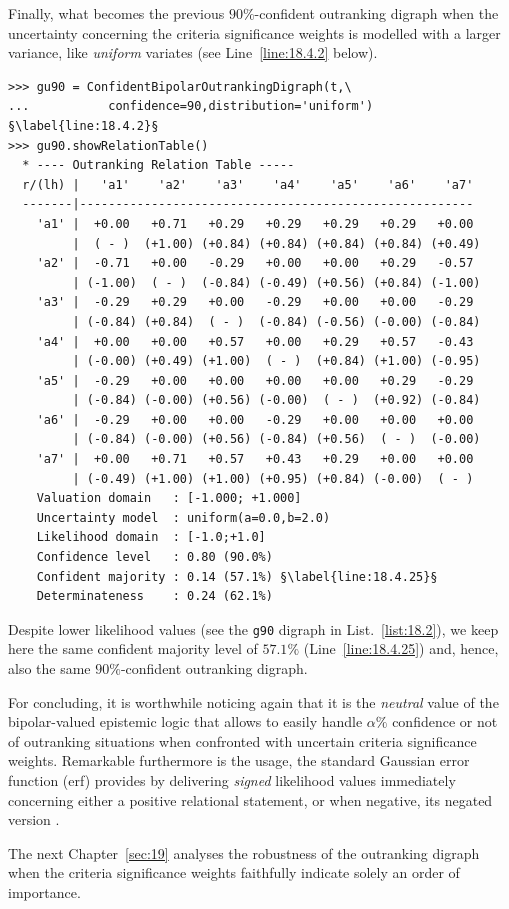 Finally, what becomes the previous $90\%$-confident outranking digraph when the uncertainty concerning the criteria significance weights is modelled with a larger variance, like \emph{uniform} variates (see Line~\ref{line:18.4.2} below).
\begin{lstlisting}[caption={$90\%$-confident outranking digraph with uniform variates},label=list:18.4, basicstyle=\ttfamily\scriptsize]
>>> gu90 = ConfidentBipolarOutrankingDigraph(t,\
...           confidence=90,distribution='uniform') §\label{line:18.4.2}§
>>> gu90.showRelationTable()
  * ---- Outranking Relation Table -----
  r/(lh) |   'a1'    'a2'    'a3'    'a4'    'a5'    'a6'    'a7'	 
  -------|-------------------------------------------------------
    'a1' |  +0.00   +0.71   +0.29   +0.29   +0.29   +0.29   +0.00  
         |  ( - )  (+1.00) (+0.84) (+0.84) (+0.84) (+0.84) (+0.49) 
    'a2' |  -0.71   +0.00   -0.29   +0.00   +0.00   +0.29   -0.57  
         | (-1.00)  ( - )  (-0.84) (-0.49) (+0.56) (+0.84) (-1.00) 
    'a3' |  -0.29   +0.29   +0.00   -0.29   +0.00   +0.00   -0.29  
         | (-0.84) (+0.84)  ( - )  (-0.84) (-0.56) (-0.00) (-0.84) 
    'a4' |  +0.00   +0.00   +0.57   +0.00   +0.29   +0.57   -0.43  
         | (-0.00) (+0.49) (+1.00)  ( - )  (+0.84) (+1.00) (-0.95) 
    'a5' |  -0.29   +0.00   +0.00   +0.00   +0.00   +0.29   -0.29  
         | (-0.84) (-0.00) (+0.56) (-0.00)  ( - )  (+0.92) (-0.84) 
    'a6' |  -0.29   +0.00   +0.00   -0.29   +0.00   +0.00   +0.00  
         | (-0.84) (-0.00) (+0.56) (-0.84) (+0.56)  ( - )  (-0.00) 
    'a7' |  +0.00   +0.71   +0.57   +0.43   +0.29   +0.00   +0.00  
         | (-0.49) (+1.00) (+1.00) (+0.95) (+0.84) (-0.00)  ( - )  
    Valuation domain   : [-1.000; +1.000] 
    Uncertainty model  : uniform(a=0.0,b=2.0) 
    Likelihood domain  : [-1.0;+1.0] 
    Confidence level   : 0.80 (90.0%) 
    Confident majority : 0.14 (57.1%) §\label{line:18.4.25}§
    Determinateness    : 0.24 (62.1%)
\end{lstlisting}

Despite lower likelihood values (see the \texttt{g90} digraph in List.~\vref{list:18.2}), we keep here the same confident majority level of $57.1\%$ (Line~\ref{line:18.4.25}) and, hence, also the same $90\%$-confident outranking digraph.

For concluding, it is worthwhile noticing again that it is the \emph{neutral} value of the bipolar-valued epistemic logic that allows to easily handle $\alpha\%$ confidence or not of outranking situations when confronted with uncertain criteria significance weights. Remarkable furthermore is the usage, the standard Gaussian error function (erf) provides by delivering \emph{signed} likelihood values immediately concerning either a positive relational statement, or when negative, its negated version \citep{NR3-2007-6}. 

\vspace{\baselineskip}
The next Chapter~\ref{sec:19} analyses the robustness of the outranking digraph when the criteria significance weights faithfully indicate solely an order of importance.
%



